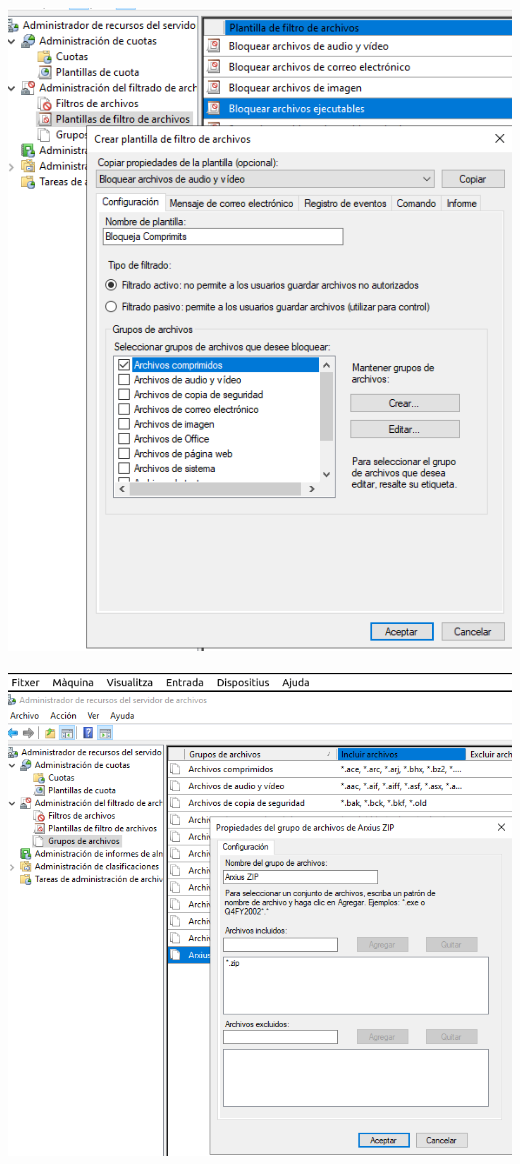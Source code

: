 \documentclass[
  a4paper,
]{article}
\begin{document}
\includegraphics{png/Cuota5.png}

\includegraphics{png/Cuota6.png}
\end{document}
